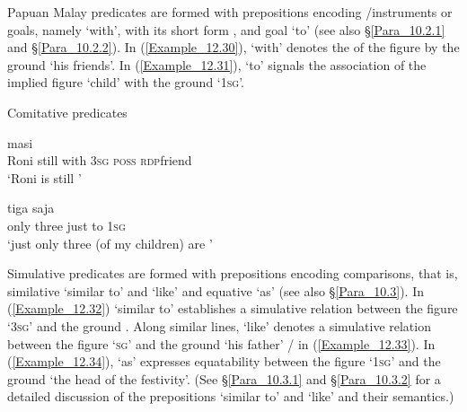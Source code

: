 Papuan Malay  predicates are formed with prepositions encoding /instruments or goals, namely   ‘with’, with its short form , and goal   ‘to’ (see also §\ref{Para_10.2.1} and §\ref{Para_10.2.2}). In (\ref{Example_12.30}),  ‘with’ denotes the  of the figure  by the ground  ‘his friends’. In (\ref{Example_12.31}),  ‘to’ signals the association of the implied figure  ‘child’ with the ground  ‘1\textsc{sg}’.


\begin{styleExampleTitle}
Comitative predicates
\end{styleExampleTitle}

\ea
\label{Example_12.30}
 {masi} {} {} {} {}\\ %
 Roni  still  with  \textsc{3sg}  \textsc{poss}  \textsc{rdp}{\Tilde}friend\\
\glt 
‘Roni is still ’ \textstyleExampleSource{[081006-031-Cv.0011]}
\z

\ea
\label{Example_12.31}
 {tiga} {saja} {} {}\\ %
 only  three  just  to  \textsc{1sg}\\
\glt 
‘just only three (of my children) are ’ \textstyleExampleSource{[081006-024-CvEx.0001]}
\z


Simulative predicates are formed with prepositions encoding comparisons, that is, similative  ‘similar to’ and  ‘like’ and equative  ‘as’ (see also §\ref{Para_10.3}). In (\ref{Example_12.32})  ‘similar to’ establishes a simulative relation between the figure  ‘3\textsc{sg}’ and the ground . Along similar lines,  ‘like’ denotes a simulative relation between the figure  ‘\textsc{sg}’ and the ground  ‘his father’ /  in (\ref{Example_12.33}). In (\ref{Example_12.34}),  ‘as’ expresses equatability between the figure  ‘\textsc{1sg}’ and the ground  ‘the head of the festivity’. (See §\ref{Para_10.3.1} and §\ref{Para_10.3.2} for a detailed discussion of the prepositions  ‘similar to’ and  ‘like’ and their semantics.)


